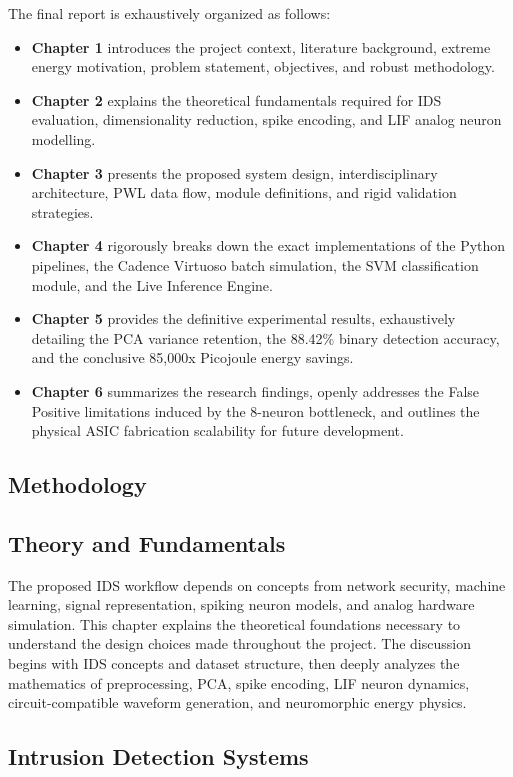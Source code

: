 \documentclass{ieeeaccess}
\begin{document}
The final report is exhaustively organized as follows:
\begin{itemize}
\item \textbf{Chapter 1} introduces the project context, literature background, extreme energy motivation, problem statement, objectives, and robust methodology.
\item \textbf{Chapter 2} explains the theoretical fundamentals required for IDS evaluation, dimensionality reduction, spike encoding, and LIF analog neuron modelling.
\item \textbf{Chapter 3} presents the proposed system design, interdisciplinary architecture, PWL data flow, module definitions, and rigid validation strategies.
\item \textbf{Chapter 4} rigorously breaks down the exact implementations of the Python pipelines, the Cadence Virtuoso batch simulation, the SVM classification module, and the Live Inference Engine.
\item \textbf{Chapter 5} provides the definitive experimental results, exhaustively detailing the PCA variance retention, the 88.42\% binary detection accuracy, and the conclusive 85,000x Picojoule energy savings.
\item \textbf{Chapter 6} summarizes the research findings, openly addresses the False Positive limitations induced by the 8-neuron bottleneck, and outlines the physical ASIC fabrication scalability for future development.
\end{itemize}


\subsection{Methodology}
\subsection{Theory and Fundamentals}

The proposed IDS workflow depends on concepts from network security, machine learning, signal representation, spiking neuron models, and analog hardware simulation. This chapter explains the theoretical foundations necessary to understand the design choices made throughout the project. The discussion begins with IDS concepts and dataset structure, then deeply analyzes the mathematics of preprocessing, PCA, spike encoding, LIF neuron dynamics, circuit-compatible waveform generation, and neuromorphic energy physics.

\subsection{Intrusion Detection Systems}
\end{document}
